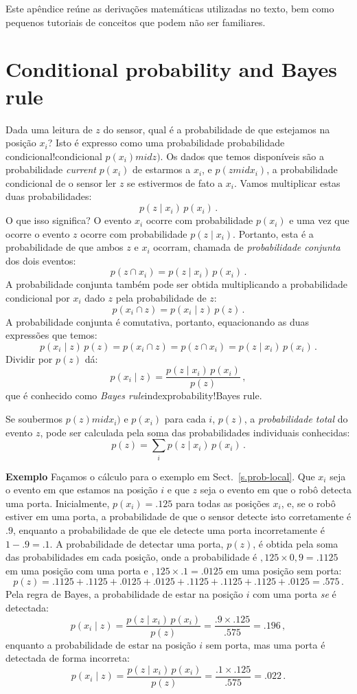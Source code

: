 Este apêndice reúne as derivações matemáticas utilizadas no texto, bem como pequenos tutoriais de conceitos que podem não ser familiares.

\section{Conditional probability and Bayes rule}\label{a.bayes}

Dada uma leitura de $z$ do sensor, qual é a probabilidade de que estejamos na posição $x_i$? Isto é expresso como uma probabilidade {probabilidade condicional!condicional} $p(x_i)mid z)$. Os dados que temos disponíveis são a probabilidade \emph{current} $p(x_i)$ de estarmos a $x_i$, e $p(zmid x_i)$, a probabilidade condicional de o sensor ler $z$ se estivermos de fato a $x_i$. Vamos multiplicar estas duas probabilidades:
\[
p(z\mid x_i)\, p(x_i)\,.
\]
O que isso significa? O evento $x_i$ ocorre com probabilidade $p(x_i)$ e uma vez que ocorre o evento $z$ ocorre com probabilidade $p(z\mid x_i)$. Portanto, esta é a probabilidade de que ambos $z$ e $x_i$ ocorram, chamada de \emph{probabilidade conjunta} dos dois eventos:
\[
p(z \cap x_i) = p(z\mid x_i)\, p(x_i)\,.
\]
A probabilidade conjunta também pode ser obtida multiplicando a probabilidade condicional por $x_i$ dado $z$ pela probabilidade de $z$:
\[
p(x_i \cap z) = p(x_i\mid z)\, p(z)\,.
\]
A probabilidade conjunta é comutativa, portanto, equacionando as duas expressões que temos:
\[
p(x_i\mid z)\, p(z) = p(x_i \cap z) = p(z \cap x_i) = p(z\mid x_i)\, p(x_i)\,.
\]
Dividir por $p(z)$ dá:
\[
p(x_i\mid z)= \frac{p(z\mid x_i)\, p(x_i)}{p(z)}\,,
\]
que é conhecido como \emph{Bayes rule}index{probability!Bayes rule}.

Se soubermos $p(z)mid x_i)$ e $p(x_i)$ para cada $i$, $p(z)$, a \emph{probabilidade total} do evento $z$, pode ser calculada pela soma das probabilidades individuais conhecidas:
\begin{displaymath}
p(z) = \sum_i p(z\mid x_i)\, p(x_i)\,.
\end{displaymath}

\noindent\textbf{Exemplo} Façamos o cálculo para o exemplo em Sect.~\ref{s.prob-local}. Que $x_i$ seja o evento em que estamos na posição $i$ e que $z$ seja o evento em que o robô detecta uma porta. Inicialmente, $p(x_i)=.125$ para todas as posições $x_i$, e, se o robô estiver em uma porta, a probabilidade de que o sensor detecte isto corretamente é $.9$, enquanto a probabilidade de que ele detecte uma porta incorretamente é $1-.9=.1$. A probabilidade de detectar uma porta, $p(z)$, é obtida pela soma das probabilidades em cada posição, onde a probabilidade é $,125\times 0,9 = .1125$ em uma posição com uma porta e $,125\times .1= .0125$ em uma posição sem porta:
\[
p(z)=.1125 + .1125 + .0125 + .0125 + .1125 + .1125 + .1125 + .0125 = .575\,.
\]
Pela regra de Bayes, a probabilidade de estar na posição $i$ com uma porta \emph{se} é detectada:
\[
p(x_i \mid z) = \frac{p(z\mid x_i)\, p(x_i)}{p(z)}=\frac{.9\times .125}{.575} = .196\,,
\]
enquanto a probabilidade de estar na posição $i$ sem porta, mas uma porta é detectada de forma incorreta:
\[
p(x_i \mid z) = \frac{p(z\mid x_i)\, p(x_i)}{p(z)}=\frac{.1\times .125}{.575} = .022\,.
\]

